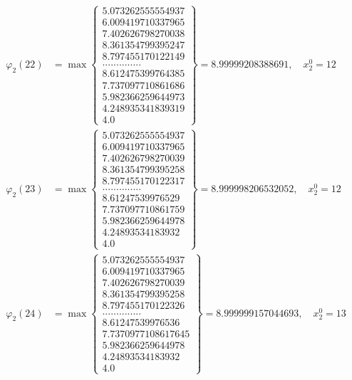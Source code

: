 \documentclass{article}
\begin{document}
\begin{align*}
  
  
  
\varphi_{2}(22) &= \max \left\{ \begin{array}{c}
5.073262555554937 \\
 6.009419710337965 \\
 7.402626798270038 \\
 8.361354799395247 \\
 8.797455170122149 \\
 .............. \\
 8.612475399764385 \\
 7.737097710861686 \\
 5.982366259644973 \\
 4.248935341839319 \\
 4.0
\end{array} \right\} = 8.99999208388691, \quad x_{2}^0 = 12\\
  
  
  
  
\varphi_{2}(23) &= \max \left\{ \begin{array}{c}
5.073262555554937 \\
 6.009419710337965 \\
 7.402626798270039 \\
 8.361354799395258 \\
 8.797455170122317 \\
 .............. \\
 8.61247539976529 \\
 7.737097710861759 \\
 5.982366259644978 \\
 4.24893534183932 \\
 4.0
\end{array} \right\} = 8.999998206532052, \quad x_{2}^0 = 12\\
  
  
  
  
\varphi_{2}(24) &= \max \left\{ \begin{array}{c}
5.073262555554937 \\
 6.009419710337965 \\
 7.402626798270039 \\
 8.361354799395258 \\
 8.797455170122326 \\
 .............. \\
 8.61247539976536 \\
 7.7370977108617645 \\
 5.982366259644978 \\
 4.24893534183932 \\
 4.0
\end{array} \right\} = 8.999999157044693, \quad x_{2}^0 = 13\\
  

\end{align*}
\end{document}
